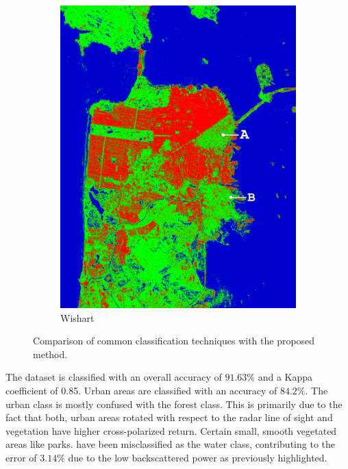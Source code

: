 \begin{figure}[tbp]
\begin{subfigure}[t]{0.19\textwidth}
		\includegraphics[trim={150px 80px 40px 50px},clip,width=\columnwidth]{Figures/ALOS2_SF_3Class/wishart_supervised_class_1x1} 
		\caption{Wishart}
		\label{fig:al2_wish_1}
	\end{subfigure}
	\caption{Comparison of common classification techniques with the proposed method.}
	\label{fig:comparison_al2}
\end{figure}

The dataset is classified with an overall accuracy of $91.63\%$ and a Kappa coefficient of 0.85. Urban areas are classified with an accuracy of $84.2\%$. The urban class is mostly confused with the forest class. This is primarily due to the fact that both, urban areas rotated with respect to the radar line of sight and vegetation have higher cross-polarized return. Certain small, smooth vegetated areas like parks. have been misclassified as the water class, contributing to the error of $3.14\%$ due to the low backscattered power as  previously highlighted. 


